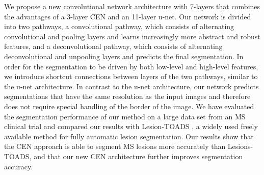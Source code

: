 We propose a new convolutional network architecture with 7-layers that combines
the advantages of a 3-layer CEN and an 11-layer u-net. Our network is divided
into two pathways, a convolutional pathway, which consists of alternating
convolutional and pooling layers and learns increasingly more abstract and
robust features, and a deconvolutional pathway, which consists of alternating
deconvolutional and unpooling layers and predicts the final segmentation. In
order for the segmentation to be driven by both low-level and high-level
features, we introduce shortcut connections between layers of the two pathways,
similar to the u-net architecture. In contrast to the u-net architecture, our
network predicts segmentations that have the same resolution as the input images
and therefore does not require special handling of the border of the image. We
have evaluated the segmentation performance of our method on a large data set
from an MS clinical trial and compared our results with Lesion-TOADS
\cite{shiee2010topology}, a widely used freely available method for fully
automatic lesion segmentation. Our results show that the CEN approach is able to
segment MS lesions more accurately than Lesions-TOADS, and that our new CEN
architecture further improves segmentation accuracy.




